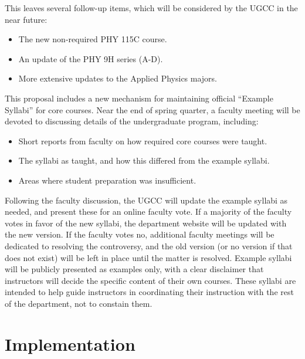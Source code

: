 \documentclass[12pt]{article}
\begin{document}
This leaves several follow-up items, which will be considered by the UGCC in the near future:
\begin{itemize}
 \item The new non-required PHY 115C course.
 \item An update of the PHY 9H series (A-D).
 \item More extensive updates to the Applied Physics majors.
\end{itemize}
This proposal includes a new mechanism for maintaining official
``Example Syllabi'' for core courses.  Near the end of spring quarter,
a faculty meeting will be devoted to discussing details of the
undergraduate program, including:
\begin{itemize} 
 \item Short reports from faculty on how required core courses were taught.
 \item The syllabi as taught, and how this differed from the example syllabi.
 \item Areas where student preparation was insufficient.
\end{itemize}
Following the faculty discussion, the UGCC will update the example
syllabi as needed, and present these for an online faculty vote.  If a
majority of the faculty votes in favor of the new syllabi, the
department website will be updated with the new version.  If the
faculty votes no, additional faculty meetings will be dedicated to
resolving the controversy, and the old version (or no version if that
does not exist) will be left in place until the matter is resolved.
Example syllabi will be publicly presented as examples only, with a
clear disclaimer that instructors will decide the specific content of
their own courses.  These syllabi are intended to help guide
instructors in coordinating their instruction with the rest of the
department, not to constain them.

\section{Implementation}
\label{sec:implementation}
\end{document}
